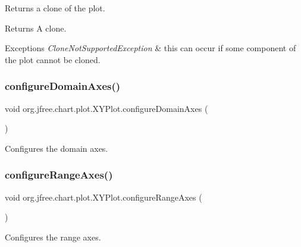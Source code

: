Returns a clone of the plot.

\begin{DoxyReturn}{Returns}
A clone.
\end{DoxyReturn}

\begin{DoxyExceptions}{Exceptions}
{\em Clone\+Not\+Supported\+Exception} & this can occur if some component of the plot cannot be cloned. \\
\hline
\end{DoxyExceptions}
\mbox{\label{classorg_1_1jfree_1_1chart_1_1plot_1_1_x_y_plot_af126a8a9a86d19e7a8dbc802ba88b1df}} 
\subsubsection{\texorpdfstring{configure\+Domain\+Axes()}{configureDomainAxes()}}
{\footnotesize\ttfamily void org.\+jfree.\+chart.\+plot.\+X\+Y\+Plot.\+configure\+Domain\+Axes (\begin{DoxyParamCaption}{ }\end{DoxyParamCaption})}

Configures the domain axes. \mbox{\label{classorg_1_1jfree_1_1chart_1_1plot_1_1_x_y_plot_a4b6a0d47c950a1ed93304a5fb89508dc}} 
\subsubsection{\texorpdfstring{configure\+Range\+Axes()}{configureRangeAxes()}}
{\footnotesize\ttfamily void org.\+jfree.\+chart.\+plot.\+X\+Y\+Plot.\+configure\+Range\+Axes (\begin{DoxyParamCaption}{ }\end{DoxyParamCaption})}

Configures the range axes.

